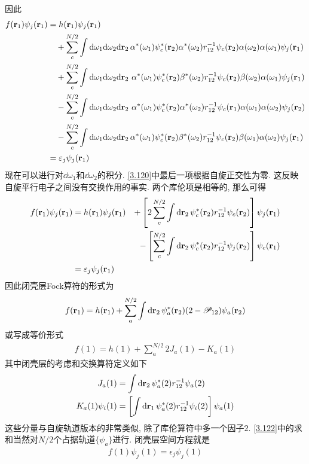 因此
\begin{align}
	f(\mathbf{r}_1)\psi_j(\mathbf{r}_1) & = h(\mathbf{r}_1)\psi_j(\mathbf{r}_1)\notag\\
	& {}\quad + \sum_c^{N/2}\int\dd\omega_1\dd\omega_2\dd{r}_2\,\alpha^*(\omega_1)\psi_c^*(\mathbf{r}_2)\alpha^*(\omega_2)\twoe\psi_c(\mathbf{r}_2)\alpha(\omega_2)\alpha(\omega_1)\psi_j(\mathbf{r}_1)\notag\\
	& {}\quad + \sum_c^{N/2}\int\dd\omega_1\dd\omega_2\dd{r}_2\,\,\alpha^*(\omega_1)\psi_c^*(\mathbf{r}_2)\beta^*(\omega_2)\twoe\psi_c(\mathbf{r}_2)\beta(\omega_2)\alpha(\omega_1)\psi_j(\mathbf{r}_1)\notag\\
	& {}\quad - \sum_c^{N/2}\int\dd\omega_1\dd\omega_2\dd{r}_2\,\,\alpha^*(\omega_1)\psi_c^*(\mathbf{r}_2)\alpha^*(\omega_2)\twoe\psi_c(\mathbf{r}_1)\alpha(\omega_1)\alpha(\omega_2)\psi_j(\mathbf{r}_2)\notag\\
	& {}\quad - \sum_c^{N/2}\int\dd\omega_1\dd\omega_2\dd{r}_2\,\alpha^*(\omega_1)\psi_c^*(\mathbf{r}_2)\beta^*(\omega_2)\twoe\psi_c(\mathbf{r}_2)\beta(\omega_1)\alpha(\omega_2)\psi_j(\mathbf{r}_1)\notag\\
	& = \epsilon_j\psi_j(\mathbf{r}_1)
	\label{3.120}
\end{align}
现在可以进行对$\dd\omega_1$和$\dd\omega_2$的积分. 
\autoref{3.120}中最后一项根据自旋正交性为零. 
这反映自旋平行电子之间没有交换作用的事实. 
两个库伦项是相等的, 
那么可得
\begin{alignat}{3}
	f(\mathbf{r}_1)\psi_j(\mathbf{r}_1) 
	& = h(\mathbf{r}_1)\psi_j(\mathbf{r}_1) & + \left[ 2\sum_c^{N/2}\int\dd{r}_2\,\psi_c^*(\mathbf{r}_2)\twoe\psi_c(\mathbf{r}_2)\right]\psi_j(\mathbf{r}_1)\notag\\
	&                                       & - \left[  \sum_c^{N/2}\int\dd{r}_2\,\psi_c^*(\mathbf{r}_2)\twoe\psi_j(\mathbf{r}_2)\right]\psi_c(\mathbf{r}_1)\notag\\
	& = \epsilon_j\psi_j(\bfr_1)&
\end{alignat}
因此闭壳层Fock算符的形式为
\begin{align}
	\label{3.122}
	f(\bfr_1) = h(\bfr_1) + \sum_a^{N/2}\int\dd{r}_2\,\psi_a^*(\bfr_2)(2-\scr{P}_{12})\psi_a(\bfr_2)
\end{align}
或写成等价形式
\begin{align}
	f(1) = h(1) + \sum_a^{N/2} 2J_a(1) - K_a(1)
\end{align}
其中闭壳层的考虑和交换算符定义如下
\begin{align}
	J_a(1) & = \int\dd{r}_2\,\psi_a^*(2)\twoe\psi_a(2) \label{3.124}\\
	K_a(1) \psi_i(1) & = \left[ \int\dd{r}_1\,\psi_a^*(2)\twoe\psi_i(2) \right]\psi_a(1) \label{3.125}
\end{align}
这些分量与自旋轨道版本的非常类似, 
除了库伦算符中多一个因子$2$. 
\autoref{3.122}中的求和当然对$N/2$个占据轨道$\{\psi_a\}$进行. 
闭壳层空间\hft 方程就是
\begin{align}
	f(1)\psi_j(1) = \epsilon_j\psi_j(1)
\end{align}


